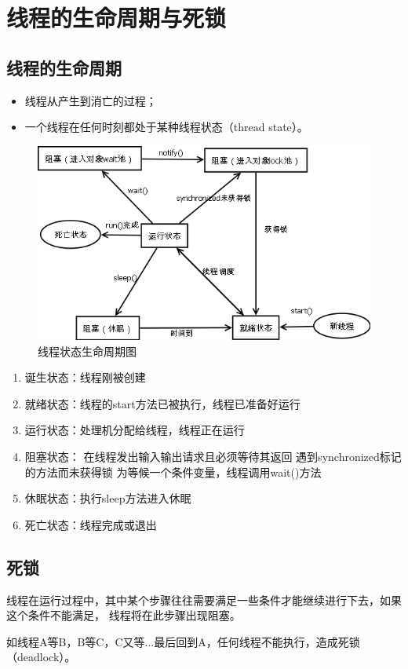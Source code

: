 \section{线程的生命周期与死锁}
\subsection{线程的生命周期}
\begin{itemize}
	\item 线程从产生到消亡的过程；
	\item 一个线程在任何时刻都处于某种线程状态（thread state）。
\end{itemize}
\begin{figure}[!h]
	\centering
	\includegraphics[width=\textwidth]{image/thread.png}
	\caption{线程状态生命周期图}
\end{figure}
\begin{enumerate}
	\item 诞生状态：线程刚被创建
	\item 就绪状态：线程的start方法已被执行，线程已准备好运行
	\item 运行状态：处理机分配给线程，线程正在运行
	\item 阻塞状态：
	\subitem 在线程发出输入输出请求且必须等待其返回
	\subitem 遇到synchronized标记的方法而未获得锁
	\subitem 为等候一个条件变量，线程调用wait()方法
	\item 休眠状态：执行sleep方法进入休眠
	\item 死亡状态：线程完成或退出
\end{enumerate}
\subsection{死锁}
线程在运行过程中，其中某个步骤往往需要满足一些条件才能继续进行下去，如果这个条件不能满足，
线程将在此步骤出现阻塞。
\par 如线程A等B，B等C，C又等...最后回到A，任何线程不能执行，造成死锁（deadlock）。
